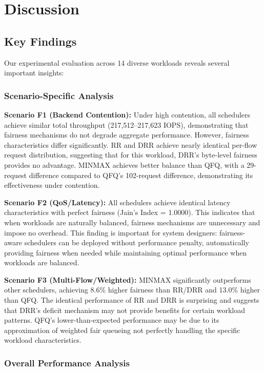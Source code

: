 \documentclass[11pt]{article}
\begin{document}
\section{Discussion}

\subsection{Key Findings}

Our experimental evaluation across 14 diverse workloads reveals several important insights:

\subsubsection{Scenario-Specific Analysis}

\textbf{Scenario F1 (Backend Contention):} Under high contention, all schedulers achieve similar total throughput (217,512--217,623 IOPS), demonstrating that fairness mechanisms do not degrade aggregate performance. However, fairness characteristics differ significantly. RR and DRR achieve nearly identical per-flow request distribution, suggesting that for this workload, DRR's byte-level fairness provides no advantage. MINMAX achieves better balance than QFQ, with a 29-request difference compared to QFQ's 102-request difference, demonstrating its effectiveness under contention.

\textbf{Scenario F2 (QoS/Latency):} All schedulers achieve identical latency characteristics with perfect fairness (Jain's Index = 1.0000). This indicates that when workloads are naturally balanced, fairness mechanisms are unnecessary and impose no overhead. This finding is important for system designers: fairness-aware schedulers can be deployed without performance penalty, automatically providing fairness when needed while maintaining optimal performance when workloads are balanced.

\textbf{Scenario F3 (Multi-Flow/Weighted):} MINMAX significantly outperforms other schedulers, achieving 8.6\% higher fairness than RR/DRR and 13.0\% higher than QFQ. The identical performance of RR and DRR is surprising and suggests that DRR's deficit mechanism may not provide benefits for certain workload patterns. QFQ's lower-than-expected performance may be due to its approximation of weighted fair queueing not perfectly handling the specific workload characteristics.

\subsubsection{Overall Performance Analysis}
\end{document}

